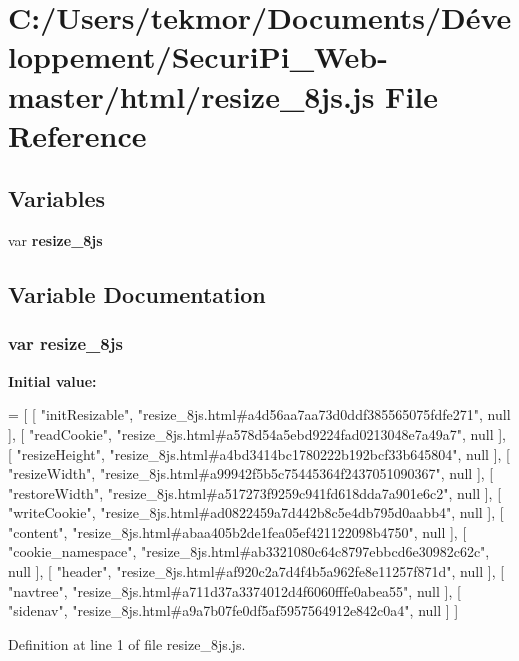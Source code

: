 \section{C\+:/\+Users/tekmor/\+Documents/\+Développement/\+Securi\+Pi\+\_\+\+Web-\/master/html/resize\+\_\+8js.js File Reference}
\label{resize__8js_8js}
\subsection*{Variables}
\begin{DoxyCompactItemize}
\item 
var {\bf resize\+\_\+8js}
\end{DoxyCompactItemize}


\subsection{Variable Documentation}
\subsubsection[{resize\+\_\+8js}]{\setlength{\rightskip}{0pt plus 5cm}var resize\+\_\+8js}\label{resize__8js_8js_ab664457d17168c147bb6f85621114bd0}
{\bfseries Initial value\+:}
\begin{DoxyCode}
=
[
    [ \textcolor{stringliteral}{"initResizable"}, \textcolor{stringliteral}{"resize\_8js.html#a4d56aa7aa73d0ddf385565075fdfe271"}, null ],
    [ \textcolor{stringliteral}{"readCookie"}, \textcolor{stringliteral}{"resize\_8js.html#a578d54a5ebd9224fad0213048e7a49a7"}, null ],
    [ \textcolor{stringliteral}{"resizeHeight"}, \textcolor{stringliteral}{"resize\_8js.html#a4bd3414bc1780222b192bcf33b645804"}, null ],
    [ \textcolor{stringliteral}{"resizeWidth"}, \textcolor{stringliteral}{"resize\_8js.html#a99942f5b5c75445364f2437051090367"}, null ],
    [ \textcolor{stringliteral}{"restoreWidth"}, \textcolor{stringliteral}{"resize\_8js.html#a517273f9259c941fd618dda7a901e6c2"}, null ],
    [ \textcolor{stringliteral}{"writeCookie"}, \textcolor{stringliteral}{"resize\_8js.html#ad0822459a7d442b8c5e4db795d0aabb4"}, null ],
    [ \textcolor{stringliteral}{"content"}, \textcolor{stringliteral}{"resize\_8js.html#abaa405b2de1fea05ef421122098b4750"}, null ],
    [ \textcolor{stringliteral}{"cookie\_namespace"}, \textcolor{stringliteral}{"resize\_8js.html#ab3321080c64c8797ebbcd6e30982c62c"}, null ],
    [ \textcolor{stringliteral}{"header"}, \textcolor{stringliteral}{"resize\_8js.html#af920c2a7d4f4b5a962fe8e11257f871d"}, null ],
    [ \textcolor{stringliteral}{"navtree"}, \textcolor{stringliteral}{"resize\_8js.html#a711d37a3374012d4f6060fffe0abea55"}, null ],
    [ \textcolor{stringliteral}{"sidenav"}, \textcolor{stringliteral}{"resize\_8js.html#a9a7b07fe0df5af5957564912e842c0a4"}, null ]
]
\end{DoxyCode}


Definition at line 1 of file resize\+\_\+8js.\+js.

